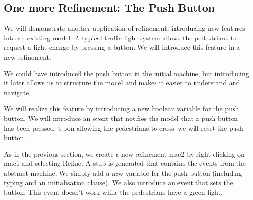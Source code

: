 {\begin{description}
\begin{description}
\begin{description}
			\end{description}
		\Witnesses
			\begin{description}
			\end{description}
		\ThenAct
			\begin{description}
			\nItemX{ act1 }{ cars\_colors :=  new\_value\_colors }
			\end{description}
		\EndAct
		\end{description}
\END
\end{description}
}

\subsection{One more Refinement: The Push Button}

We will demonstrate another application of refinement: introducing new features into an existing model.  A typical traffic light system allows the pedestrians to request a light change by pressing a button.  We will introduce this feature in a new refinement.

We could have introduced the push button in the initial machine, but introducing it later allows us to structure the model and makes it easier to understand and navigate.

We will realize this feature by introducing a new boolean variable for the push button.  We will introduce an event that notifies the model that a push button has been pressed.  Upon allowing the pedestrians to cross, we will reset the push button.

As in the previous section, we create a new refinement \textsf{mac2} by right-clicking on \textsf{mac1} and selecting \textsf{Refine}.  A stub is generated that contains the events from the abstract machine.  We simply add a new variable for the push button (including typing and an initialisation clause).  We also introduce an event that sets the button.  This event doesn't work while the pedestrians have a green light.

